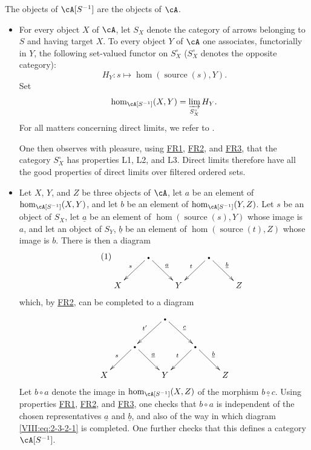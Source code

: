 The objects of $\cA[S^{-1}]$ are the objects of $\cA$.
\begin{itemize}
  \item For every object $X$ of $\cA$, let $S_X$ denote the category of
    arrows belonging to $S$ and having target $X$. To every object $Y$ of
    $\cA$ one associates, functorially in $Y$, the following set-valued
    functor on $S_X^\circ$ ($S_X^\circ$ denotes the opposite category):
    \[
      H_Y:s\mapsto \hom(\operatorname{source}(s),Y) \text{.}
    \]
    Set
    \[
      \hom_{\cA[S^{-1}]}(X,Y) = \varinjlim_{S_X^\circ} H_Y \text{.}
    \]
    For all matters concerning direct limits, we refer to \cite{ar62}.

    One then observes with pleasure, using \hyperlink{VIII:FR1}{FR1},
    \hyperlink{VIII:FR2}{FR2}, and \hyperlink{VIII:FR3}{FR3}, that the
    category $S_X^\circ$ has properties L1, L2, and L3. Direct limits
    therefore have all the good properties of direct limits over filtered
    ordered sets.
  \item Let $X$, $Y$, and $Z$ be three objects of $\cA$, let $a$ be an
    element of $\hom_{\cA[S^{-1}]}(X,Y)$, and let $b$ be an element of
    $\hom_{\cA[S^{-1}]}(Y,Z)$. Let $s$ be an object of $S_X$, let
    $\underline a$ be an element of
    $\hom(\operatorname{source}(s),Y)$ whose image is $a$, and let an object
    of $S_Y$, $\underline b$ be an element of
    $\hom(\operatorname{source}(t),Z)$ whose image is $b$. There is then a
    diagram
    \begin{equation*}\tag{1}\label{VIII:eq:2-3-2-1}
    \xymatrix{
      & \bullet \ar[dl]_-s \ar[dr]^-{\underline a}
        &
        & \bullet \ar[dl]_-t \ar[dr]^-{\underline b} \\
      X
        &
        & Y
        &
        & Z
    }
    \end{equation*}
    which, by \hyperlink{VIII:FR2}{FR2}, can be completed to a diagram
    \[\xymatrix{
      & & \bullet \ar[dl]_-{t'} \ar[dr]^-{\underline c} \\
      & \bullet \ar[dl]_-s \ar[dr]^-{\underline a}
        & & \bullet \ar[dl]_-t \ar[dr]^-{\underline b} \\
      X
        & & Y
        & & Z
    }\]
    Let $b\circ a$ denote the image in $\hom_{\cA[S^{-1}]}(X,Z)$ of the
    morphism $\underline{b\circ c}$. Using properties
    \hyperlink{VIII:FR1}{FR1}, \hyperlink{VIII:FR2}{FR2}, and
    \hyperlink{VIII:FR3}{FR3}, one checks that $b\circ a$ is independent
    of the chosen representatives $\underline a$ and $\underline b$, and
    also of the way in which diagram \eqref{VIII:eq:2-3-2-1} is completed.
    One further checks that this defines a category $\cA[S^{-1}]$.
\end{itemize}

